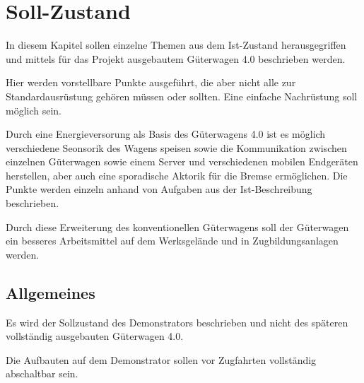 \section{Soll-Zustand}
In diesem Kapitel sollen einzelne Themen aus dem Ist-Zustand herausgegriffen und mittels für das Projekt ausgebautem Güterwagen 4.0 beschrieben werden.\par
Hier werden vorstellbare Punkte ausgeführt, die aber nicht alle zur Standardausrüstung gehören müssen oder sollten. Eine einfache Nachrüstung soll möglich sein.\par
Durch eine Energieversorung als Basis des Güterwagens 4.0 ist es möglich verschiedene Seonsorik des Wagens speisen sowie die Kommunikation zwischen einzelnen Güterwagen sowie einem Server und verschiedenen mobilen Endgeräten herstellen, aber auch eine sporadische Aktorik für die Bremse ermöglichen. Die Punkte werden einzeln anhand von Aufgaben aus der Ist-Beschreibung beschrieben. \par
Durch diese Erweiterung des konventionellen Güterwagens soll der Güterwagen ein besseres Arbeitsmittel auf dem Werksgelände und in Zugbildungsanlagen werden.
\subsection{Allgemeines}
Es wird der Sollzustand des Demonstrators beschrieben und nicht des späteren vollständig ausgebauten Güterwagen 4.0.\par
Die Aufbauten auf dem Demonstrator sollen vor Zugfahrten vollständig abschaltbar sein.
